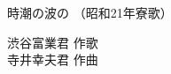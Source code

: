 \documentclass[10pt,b5j]{tarticle} %
\begin{document}
\begin{minipage}[c]{0.7\hsize} %
    \begin{center}
        {\LARGE
            時潮の波の %
        }
        {\small 
            （昭和21年寮歌） %
        }
    \end{center}
\end{minipage}
\begin{minipage}[c]{0.3\hsize} %
    \begin{flushright} %
        渋谷富業君 作歌\\寺井幸夫君 作曲 %
    \end{flushright}
\end{minipage}
\end{document}
